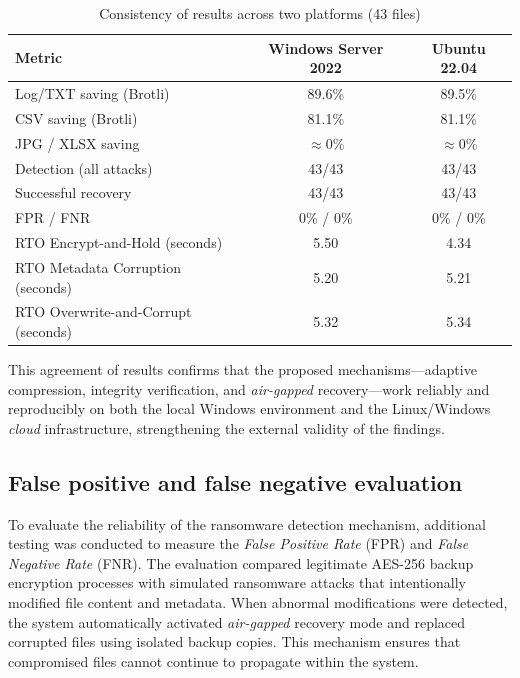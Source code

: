 \documentclass{iaesarticle}
\begin{document}
\begin{table}[H]
\centering
\fontsize{8pt}{10pt}\selectfont
\caption{Consistency of results across two platforms (43 files)}
\label{tab:cross_platform}
\begin{tabular}{l c c}
\hline
\textbf{Metric} & \textbf{Windows Server 2022} & \textbf{Ubuntu 22.04} \\
\hline
Log/TXT saving (Brotli) & 89.6\% & 89.5\% \\
CSV saving (Brotli)     & 81.1\% & 81.1\% \\
JPG / XLSX saving       & $\approx$0\% & $\approx$0\% \\
Detection (all attacks) & 43/43 & 43/43 \\
Successful recovery     & 43/43 & 43/43 \\
FPR / FNR               & 0\% / 0\% & 0\% / 0\% \\
RTO Encrypt-and-Hold (seconds) & 5.50 & 4.34 \\
RTO Metadata Corruption (seconds) & 5.20 & 5.21 \\
RTO Overwrite-and-Corrupt (seconds) & 5.32 & 5.34 \\
\hline
\end{tabular}
\end{table}

This agreement of results confirms that the proposed mechanisms---adaptive compression, integrity verification, and \textit{air-gapped} recovery---work reliably and reproducibly on both the local Windows environment and the Linux/Windows \textit{cloud} infrastructure, strengthening the external validity of the findings.

\subsection{False positive and false negative evaluation}
To evaluate the reliability of the ransomware detection mechanism, additional testing was conducted to measure the \textit{False Positive Rate} (FPR) and \textit{False Negative Rate} (FNR). The evaluation compared legitimate AES-256 backup encryption processes with simulated ransomware attacks that intentionally modified file content and metadata. When abnormal modifications were detected, the system automatically activated \textit{air-gapped} recovery mode and replaced corrupted files using isolated backup copies. This mechanism ensures that compromised files cannot continue to propagate within the system.
\end{document}
